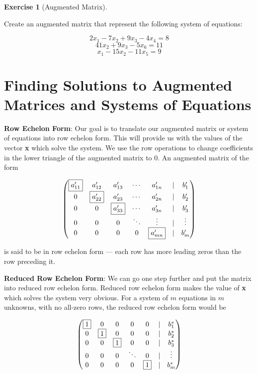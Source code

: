 \documentclass[
]{book}
\theoremstyle{definition}
\theoremstyle{definition}
\theoremstyle{definition}
\newtheorem{exercise}{Exercise}[chapter]
\theoremstyle{definition}
\theoremstyle{remark}
\begin{document}
\begin{exercise}[Augmented Matrix]
\protect\hypertarget{exr:augmatrix}{}{\label{exr:augmatrix} {} }

Create an augmented matrix that represent the following system of equations:

\[2x_1 -7x_2 + 9x_3 -4x_4 = 8\]
\[41x_2 + 9x_3 -5x_6 = 11\]
\[x_1 -15x_2 -11x_5 = 9\]
\end{exercise}

\hypertarget{finding-solutions-to-augmented-matrices-and-systems-of-equations}{%
\section{Finding Solutions to Augmented Matrices and Systems of Equations}\label{finding-solutions-to-augmented-matrices-and-systems-of-equations}}

\textbf{Row Echelon Form}: Our goal is to translate our augmented matrix or system of equations into row echelon form. This will provide us with the values of the vector \textbf{x} which solve the system. We use the row operations to change coefficients in the lower triangle of the augmented matrix to 0. An augmented matrix of the form

\[\begin{pmatrix}
            \fbox{$a'_{11}$}& a'_{12} & a'_{13}& \cdots & a'_{1n} & | & b'_1\\
            0 & \fbox{$a'_{22}$} & a'_{23}& \cdots & a'_{2n} & | & b'_2\\
            0 & 0 & \fbox{$a'_{33}$}& \cdots & a'_{3n} & | & b'_3\\
            0 & 0 &0 & \ddots & \vdots  & | & \vdots \\
            0 & 0 &0 &0 & \fbox{$a'_{mn}$} & | & b'_m
            \end{pmatrix}\]

is said to be in row echelon form --- each row has more leading zeros than the row preceding it.

\textbf{Reduced Row Echelon Form}: We can go one step further and put the matrix into reduced row echelon form. Reduced row echelon form makes the value of \textbf{x} which solves the system very obvious. For a system of \(m\) equations in \(m\) unknowns, with no all-zero rows, the reduced row echelon form would be

\[\begin{pmatrix}
            \fbox{$1$}  &  0 &   0 &    0  &   0 & | & b^*_1\\
            0  &  \fbox{$1$} &   0 &    0  &   0 & | & b^*_2\\
            0  &  0 &   \fbox{$1$} &    0  &   0 & | & b^*_3\\
            0  &  0 &   0 &\ddots &   0 & | &\vdots\\
            0  &  0 &   0 &    0  &   \fbox{$1$} & | & b^*_m
            \end{pmatrix}\]
\end{document}
